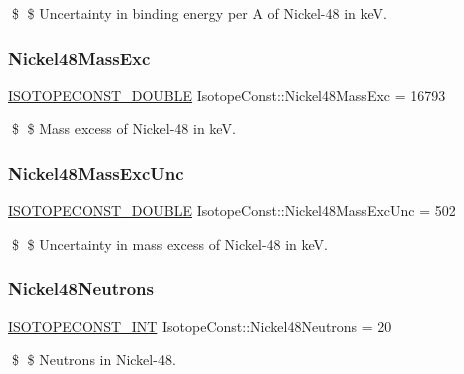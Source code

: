\$ \$ Uncertainty in binding energy per A of Nickel-\/48 in keV. \mbox{\label{group___isotope_const-_nickel-_ni48_ga6346a9a5b402a65ae64bc39f31afed21}} 
\subsubsection{\texorpdfstring{Nickel48\+Mass\+Exc}{Nickel48MassExc}}
{\footnotesize\ttfamily \mbox{\hyperlink{group___isotope_const-_macros_ga8f45a7272ce02c0b4c65c44636ed719a}{I\+S\+O\+T\+O\+P\+E\+C\+O\+N\+S\+T\+\_\+\+D\+O\+U\+B\+LE}} Isotope\+Const\+::\+Nickel48\+Mass\+Exc = 16793}

\$ \$ Mass excess of Nickel-\/48 in keV. \mbox{\label{group___isotope_const-_nickel-_ni48_gaa30238104ad6b959d39bd03cbf31253e}} 
\subsubsection{\texorpdfstring{Nickel48\+Mass\+Exc\+Unc}{Nickel48MassExcUnc}}
{\footnotesize\ttfamily \mbox{\hyperlink{group___isotope_const-_macros_ga8f45a7272ce02c0b4c65c44636ed719a}{I\+S\+O\+T\+O\+P\+E\+C\+O\+N\+S\+T\+\_\+\+D\+O\+U\+B\+LE}} Isotope\+Const\+::\+Nickel48\+Mass\+Exc\+Unc = 502}

\$ \$ Uncertainty in mass excess of Nickel-\/48 in keV. \mbox{\label{group___isotope_const-_nickel-_ni48_gad8dbba2b0721a41139f192f04724906d}} 
\subsubsection{\texorpdfstring{Nickel48\+Neutrons}{Nickel48Neutrons}}
{\footnotesize\ttfamily \mbox{\hyperlink{group___isotope_const-_macros_ga5f18360b3e99483a35c32d789e62621c}{I\+S\+O\+T\+O\+P\+E\+C\+O\+N\+S\+T\+\_\+\+I\+NT}} Isotope\+Const\+::\+Nickel48\+Neutrons = 20}

\$ \$ Neutrons in Nickel-\/48. \mbox{\label{group___isotope_const-_nickel-_ni48_gab2c76c1b83c97af4c1738b1c1b325a76}} 
